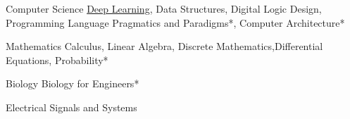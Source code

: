 

\begin{cvskills}

  \cvskill
    {Computer Science} %
    {{\href{https://www.coursera.org/specializations/deep-learning}{Deep Learning}}, Data Structures, Digital Logic Design, Programming Language Pragmatics and Paradigms*, Computer Architecture*} %


  \cvskill
    {Mathematics} %
    {Calculus, Linear Algebra, Discrete Mathematics,Differential Equations, Probability*} %


\cvskill
{Biology} %
{Biology for Engineers*}


\cvskill
{Electrical} %
{Signals and Systems} %


\end{cvskills}
